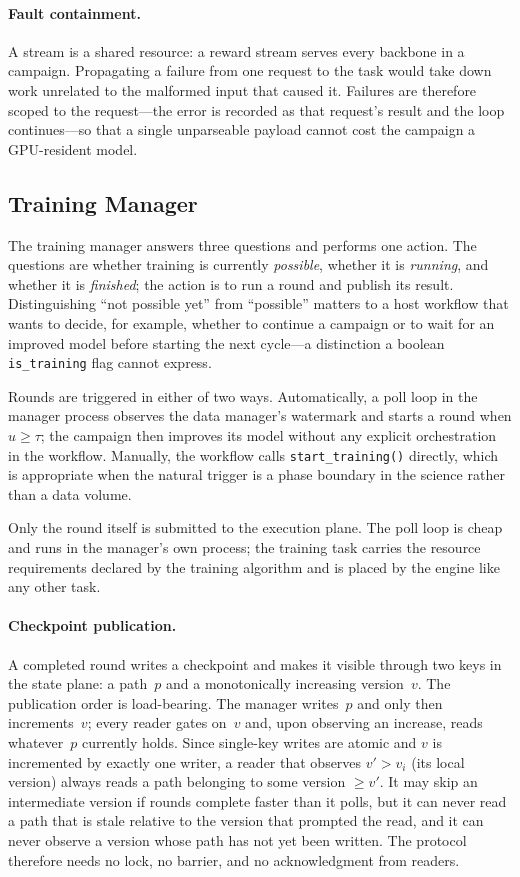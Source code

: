 \paragraph{Fault containment.}
A stream is a shared resource: a reward stream serves every backbone in a
campaign. Propagating a failure from one request to the task would take down
work unrelated to the malformed input that caused it. Failures are therefore
scoped to the request---the error is recorded as that request's result and the
loop continues---so that a single unparseable payload cannot cost the campaign
a GPU-resident model.

\subsection{Training Manager}
\label{sec:design:training}

The training manager answers three questions and performs one action. The
questions are whether training is currently \emph{possible}, whether it is
\emph{running}, and whether it is \emph{finished}; the action is to run a round
and publish its result. Distinguishing ``not possible yet'' from ``possible''
matters to a host workflow that wants to decide, for example, whether to
continue a campaign or to wait for an improved model before starting the next
cycle---a distinction a boolean \texttt{is\_training} flag cannot express.

Rounds are triggered in either of two ways. Automatically, a poll loop in the
manager process observes the data manager's watermark and starts a round when
$u \geq \tau$; the campaign then improves its model without any explicit
orchestration in the workflow. Manually, the workflow calls
\texttt{start\_training()} directly, which is appropriate when the natural
trigger is a phase boundary in the science rather than a data volume.

Only the round itself is submitted to the execution plane. The poll loop is
cheap and runs in the manager's own process; the training task carries the
resource requirements declared by the training algorithm and is placed by the
engine like any other task.

\paragraph{Checkpoint publication.}
A completed round writes a checkpoint and makes it visible through two keys in
the state plane: a path~$p$ and a monotonically increasing version~$v$. The
publication order is load-bearing. The manager writes~$p$ and only then
increments~$v$; every reader gates on~$v$ and, upon observing an increase, reads
whatever~$p$ currently holds. Since single-key writes are atomic and $v$ is
incremented by exactly one writer, a reader that observes $v' > v_i$ (its local
version) always reads a path belonging to some version $\geq v'$. It may skip an
intermediate version if rounds complete faster than it polls, but it can never
read a path that is stale relative to the version that prompted the read, and it
can never observe a version whose path has not yet been written. The protocol
therefore needs no lock, no barrier, and no acknowledgment from readers.

